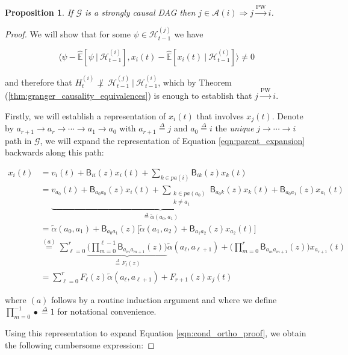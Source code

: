 \documentclass{statsoc}
\def\pwgc{\overset{\text{PW}}{\rightarrow}}  %
\def\gcg{\mathcal{G}}  %
\def\B{\mathsf{B}}  %
\def\H{\mathcal{H}}  %
\newcommand{\linE}[2]{\hat{\E}[#1\ |\ #2]}  %
\newcommand{\pa}[1]{pa(#1)}  %
\newcommand{\anc}[1]{\mathcal{A}(#1)}  %
\newcommand{\wtalpha}[2]{\widetilde{\alpha}(#1, #2)}  %
\newcommand{\gcgpath}[2]{#1 \rightarrow \cdots \rightarrow #2}  %
\newtheorem{proposition}{Proposition}
\def\defeq{\overset{\Delta}{=}}  %
\def\H{\mathcal{H}}  %
\def\E{\mathbb{E}}  %
\newcommand{\inner}[2]{\langle #1, #2 \rangle}  %
\begin{document}
\begin{proposition}
  \label{prop:pwgc_anc}
  If $\gcg$ is a strongly causal DAG then $j \in \anc{i} \Rightarrow j \pwgc i$.
\end{proposition}
\begin{proof}
  We will show that for some $\psi \in \H_{t - 1}^{(j)}$ we have

  \begin{equation}
    \label{eqn:cond_ortho_proof}
    \inner{\psi - \linE{\psi}{\H_{t - 1}^{(i)}}}{x_i(t) - \linE{x_i(t)}{\H_{t - 1}^{(i)}}} \ne 0
  \end{equation}

  and therefore that $H_t^{(i)} \not\perp\ \H_{t - 1}^{(j)}\ |\ \H_{t - 1}^{(i)}$, which by Theorem (\ref{thm:granger_causality_equivalences}) is enough to establish that $j \pwgc i$.

  Firstly, we will establish a representation of $x_i(t)$ that involves $x_j(t)$.  Denote by $a_{r + 1} \rightarrow a_r \rightarrow \cdots \rightarrow a_1 \rightarrow a_0$ with $a_{r + 1} \defeq j$ and $a_0 \defeq i$ the \textit{unique} $\gcgpath{j}{i}$ path in $\gcg$, we will expand the representation of Equation \eqref{eqn:parent_expansion} backwards along this path:

  \begin{align*}
    x_i(t) &= v_i(t) + \B_{ii}(z) x_i(t) + \sum_{k \in \pa{i}}\B_{ik}(z) x_k(t)\\
           &= \underbrace{v_{a_0}(t) + \B_{a_0a_0}(z) x_i(t) + \sum_{\substack{k \in \pa{a_0} \\ k \ne a_1}}\B_{a_0 k}(z) x_k(t)}_{\defeq \wtalpha{a_0}{a_1}} + \B_{a_0a_1}(z)x_{a_1}(t)\\
           &= \wtalpha{a_0}{a_1} + \B_{a_0a_1}(z)\big[\wtalpha{a_1}{a_2} + \B_{a_1a_2}(z)x_{a_2}(t) \big]\\
           &\overset{(a)}{=} \sum_{\ell = 0}^r \underbrace{\Big(\prod_{m = 0}^{\ell - 1} \B_{a_m a_{m + 1}}(z) \Big)}_{\defeq F_\ell(z)} \wtalpha{a_\ell}{a_{\ell + 1}} + \Big(\prod_{m = 0}^{r}\B_{a_m a_{m + 1}}(z)\Big)x_{a_{r + 1}}(t)\\
           &= \sum_{\ell = 0}^r F_\ell(z) \wtalpha{a_\ell}{a_{\ell + 1}} + F_{r + 1}(z) x_j(t)
  \end{align*}

  where $(a)$ follows by a routine induction argument and where we define $\prod_{m = 0}^{-1} \bullet \defeq 1$ for notational convenience.

  Using this representation to expand Equation \eqref{eqn:cond_ortho_proof}, we obtain the following cumbersome expression:


\end{proof}
\end{document}
